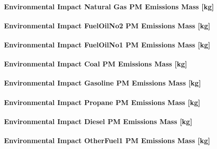 \paragraph{Environmental Impact Natural Gas PM Emissions Mass {[}kg{]}}\label{environmental-impact-natural-gas-pm-emissions-mass-kg}

\paragraph{Environmental Impact FuelOilNo2 PM Emissions Mass {[}kg{]}}\label{environmental-impact-fuel-oil-2-pm-emissions-mass-kg}

\paragraph{Environmental Impact FuelOilNo1 PM Emissions Mass {[}kg{]}}\label{environmental-impact-fuel-oil-1-pm-emissions-mass-kg}

\paragraph{Environmental Impact Coal PM Emissions Mass {[}kg{]}}\label{environmental-impact-coal-pm-emissions-mass-kg}

\paragraph{Environmental Impact Gasoline PM Emissions Mass {[}kg{]}}\label{environmental-impact-gasoline-pm-emissions-mass-kg}

\paragraph{Environmental Impact Propane PM Emissions Mass {[}kg{]}}\label{environmental-impact-propane-pm-emissions-mass-kg}

\paragraph{Environmental Impact Diesel PM Emissions Mass {[}kg{]}}\label{environmental-impact-diesel-pm-emissions-mass-kg}

\paragraph{Environmental Impact OtherFuel1 PM Emissions Mass {[}kg{]}}\label{environmental-impact-otherfuel1-pm-emissions-mass-kg}

